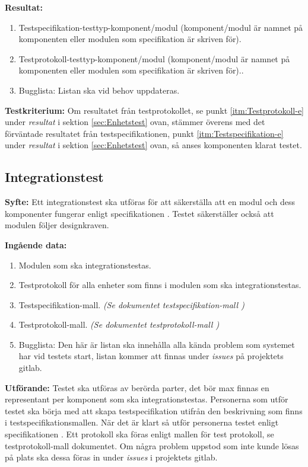 \documentclass[a4paper,10pt]{article}
\begin{document}
  \textbf{Resultat:}
    \begin{enumerate}
      \item \label{itm:Testspecifikation-e}
      Testspecifikation-testtyp-komponent/modul (komponent/modul är namnet på
      komponenten eller modulen som specifikation är skriven för).
      \item \label{itm:Testprotokoll-e} Testprotokoll-testtyp-komponent/modul
      (komponent/modul är namnet på komponenten eller modulen som specifikation
      är skriven för)..
      \item Bugglista: Listan ska vid behov uppdateras.
    \end{enumerate}

  \textbf{Testkriterium:} Om resultatet från testprotokollet, se punkt
   \ref{itm:Testprotokoll-e} under \emph{resultat} i sektion \ref{sec:Enhetstest}
  ovan, stämmer överens med det förväntade resultatet från testspecifikationen,
  punkt \ref{itm:Testspecifikation-e} under \emph{resultat} i sektion
  \ref{sec:Enhetstest} ovan, så anses komponenten klarat testet.

\subsection{Integrationstest}
\label{sec:Integrationstest}
\textbf{Syfte:}
Ett integrationstest ska utföras för att säkerställa att en modul och dess
komponenter fungerar enligt specifikationen \cite{kravspec}. Testet säkerställer
också att modulen följer designkraven.

\textbf{Ingående data:}
  \begin{enumerate}
    \item Modulen som ska integrationstestas.
    \item Testprotokoll för alla enheter som finns i modulen som ska
    integrationstestas.
    \item Testspecifikation-mall. \emph{(Se dokumentet testspecifikation-mall
    \cite{testspec-mall})}
    \item Testprotokoll-mall. \emph{(Se dokumentet testprotokoll-mall
    \cite{testprot-mall})}
    \item Bugglista: Den här är listan ska innehålla alla kända problem som
    systemet har vid testets start, listan kommer att finnas under \emph{issues}
    på projektets gitlab.
  \end{enumerate}

\textbf{Utförande:} Testet ska utföras av berörda parter, det bör max finnas en
representant per komponent som ska integrationstestas. Personerna som utför
testet ska börja med att skapa testspecifikation utifrån den beskrivning som
finns i testspecifikationsmallen. När det är klart så utför personerna
testet enligt specifikationen \cite{kravspec}. Ett protokoll ska föras enligt
mallen för test
protokoll, se testprotokoll-mall dokumentet. Om några problem uppstod som inte
kunde lösas på plats ska dessa föras in under \emph{issues} i projektets gitlab.
\end{document}
